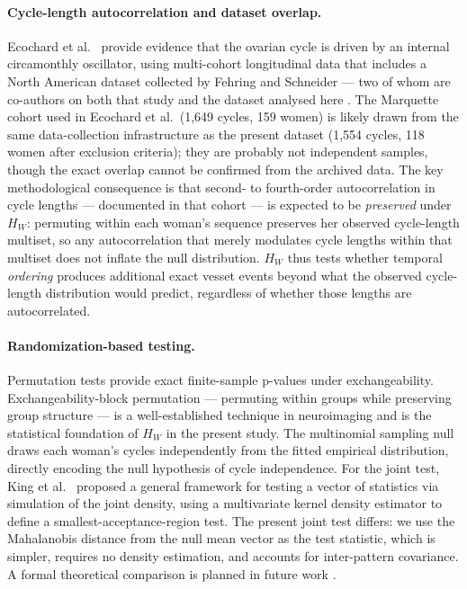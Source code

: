 \documentclass[12pt]{article}
\begin{document}
\paragraph{Cycle-length autocorrelation and dataset overlap.}
Ecochard et al.\ \cite{ecochard2024} provide evidence that the ovarian cycle is
driven by an internal circamonthly oscillator, using multi-cohort longitudinal data
that includes a North American dataset collected by Fehring and Schneider --- two of
whom are co-authors on both that study and the dataset analysed here
\cite{fehring2013}. The Marquette cohort used in Ecochard et al.\ (1,649 cycles,
159 women) is likely drawn from the same data-collection infrastructure as the
present dataset (1,554 cycles, 118 women after exclusion criteria); they are probably
not independent samples, though the exact overlap cannot be confirmed from the
archived data. The key methodological consequence is that second- to fourth-order
autocorrelation in cycle lengths --- documented in that cohort --- is expected to
be \emph{preserved} under $H_W$: permuting within each woman's sequence preserves
her observed cycle-length multiset, so any autocorrelation that merely modulates
cycle lengths within that multiset does not inflate the null distribution.
$H_W$ thus tests whether temporal \emph{ordering} produces additional exact vesset
events beyond what the observed cycle-length distribution would predict, regardless
of whether those lengths are autocorrelated.

\paragraph{Randomization-based testing.}
Permutation tests \cite{edgington2007,good2005} provide exact finite-sample p-values
under exchangeability. Exchangeability-block permutation --- permuting within groups
while preserving group structure --- is a well-established technique in neuroimaging
\cite{winkler2014,nichols2002} and is the statistical foundation of $H_W$ in the
present study. The multinomial sampling null \cite{anon2022phd} draws each
woman's cycles independently from the fitted empirical distribution, directly encoding
the null hypothesis of cycle independence. For the joint test, King et al.\
\cite{king2018} proposed a general framework for testing a vector of statistics via
simulation of the joint density, using a multivariate kernel density estimator to
define a smallest-acceptance-region test. The present joint test differs: we use the
Mahalanobis distance from the null mean vector as the test statistic, which is simpler,
requires no density estimation, and accounts for inter-pattern covariance. A formal
theoretical comparison is planned in future work \cite{anon2022phd}.
\end{document}
